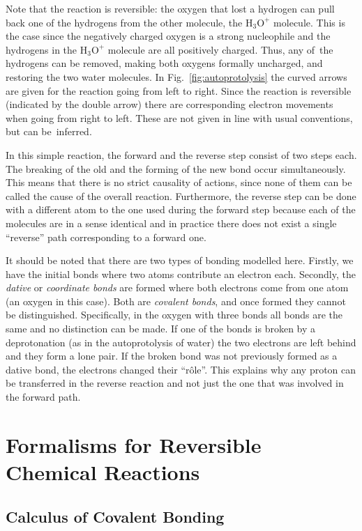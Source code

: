 \documentclass[runningheads]{llncs}
\begin{document}
Note that the reaction is reversible: the oxygen that lost a hydrogen can 
pull back one of the hydrogens from the other molecule, the  $\mathrm{H_3O^+}$ molecule. This is the case since the negatively 
charged oxygen is a strong nucleophile and the hydrogens in the $\mathrm{H_3O^+}$ molecule are 
all positively charged. Thus, any of~the hydrogens 
can be removed, making both oxygens formally uncharged, and restoring the two water 
molecules. In Fig.~\ref{fig:autoprotolysis} the curved arrows are given for the reaction going from left to right. Since the reaction is reversible (indicated by the double arrow) there are corresponding
electron movements when going from right to left. These are not given in line with usual conventions, but can be~inferred.

In this simple reaction, the forward and the reverse step consist of two steps each. The breaking of the old and the forming of the new bond occur simultaneously. This means that there is no strict causality of actions, since none of them can be called the cause of the overall reaction. Furthermore, the reverse step can be done with a different atom to the one used during the forward step because each of the molecules are in a sense identical and in practice there does not exist a single ``reverse'' path corresponding to a forward one.%

It should be noted that there are two types of bonding modelled here. Firstly, we have the initial bonds where two atoms contribute an electron each. Secondly, the \emph{dative} or \emph{coordinate bonds} are formed where both electrons come from one atom (an oxygen in this case). Both are \emph{covalent bonds}, and once formed they cannot be distinguished. Specifically, in the oxygen with three bonds all bonds are the same and no distinction can be made. If one of the bonds is broken by a deprotonation (as in the autoprotolysis of water) the two electrons are left behind and they form a lone pair. If the broken bond was not previously formed as a dative bond, the electrons changed their ``r\^ole''. This explains why any proton can be transferred in the reverse reaction and not just the one that was 
involved in the forward path.

\section{Formalisms for Reversible Chemical Reactions}
\subsection{Calculus of Covalent Bonding}
\label{sec:ccb}
\end{document}
